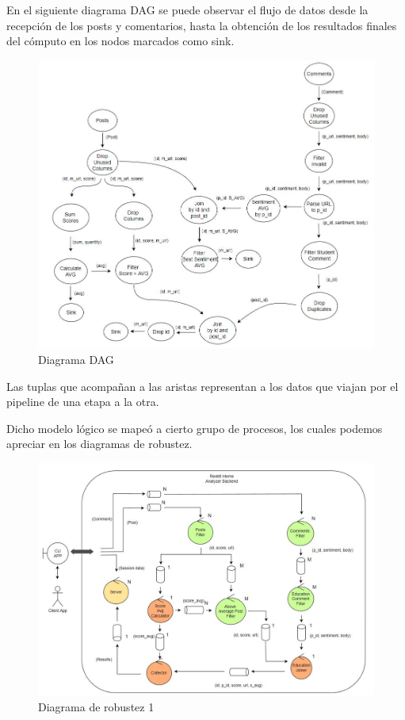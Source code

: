 \documentclass[titlepage,a4paper,oneside]{article}
\begin{document}
En el siguiente diagrama DAG se puede observar el flujo de datos desde la recepción de los posts y comentarios, hasta la obtención de los resultados finales del cómputo en los nodos marcados como sink.

\begin{figure}[H]
	\centering
	\includegraphics[width=12cm]{img/dag.JPG}
	\caption{Diagrama DAG}
\end{figure}

Las tuplas que acompañan a las aristas representan a los datos que viajan por el pipeline de una etapa a la otra.

Dicho modelo lógico se mapeó a cierto grupo de procesos, los cuales podemos apreciar en los diagramas de robustez.

\begin{figure}[H]
	\centering
	\includegraphics[width=11.5cm]{img/robustez_1.JPG}
	\caption{Diagrama de robustez 1}
\end{figure}
\end{document}
